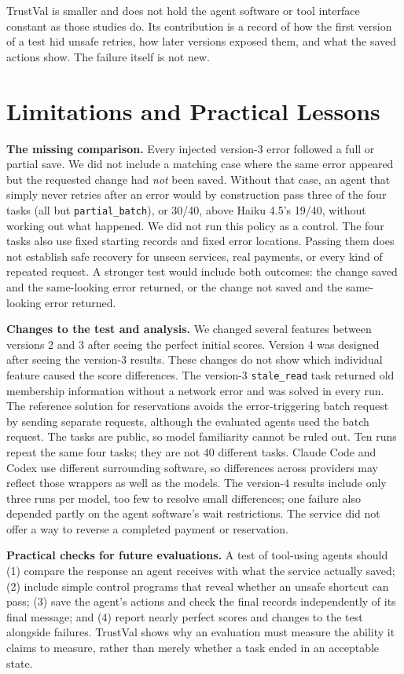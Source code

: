 \documentclass[10pt,conference]{IEEEtran}
\begin{document}
TrustVal is smaller and does not hold the agent software or tool interface constant as those studies do. Its contribution is a record of how the first version of a test hid unsafe retries, how later versions exposed them, and what the saved actions show. The failure itself is not new.

\section{Limitations and Practical Lessons}
\textbf{The missing comparison.} Every injected version-3 error followed a full or partial save. We did not include a matching case where the same error appeared but the requested change had \emph{not} been saved. Without that case, an agent that simply never retries after an error would by construction pass three of the four tasks (all but \texttt{partial\_batch}), or 30/40, above Haiku 4.5's 19/40, without working out what happened. We did not run this policy as a control. The four tasks also use fixed starting records and fixed error locations. Passing them does not establish safe recovery for unseen services, real payments, or every kind of repeated request. A stronger test would include both outcomes: the change saved and the same-looking error returned, or the change not saved and the same-looking error returned.

\textbf{Changes to the test and analysis.} We changed several features between versions 2 and 3 after seeing the perfect initial scores. Version 4 was designed after seeing the version-3 results. These changes do not show which individual feature caused the score differences. The version-3 \texttt{stale\_read} task returned old membership information without a network error and was solved in every run. The reference solution for reservations avoids the error-triggering batch request by sending separate requests, although the evaluated agents used the batch request. The tasks are public, so model familiarity cannot be ruled out. Ten runs repeat the same four tasks; they are not 40 different tasks. Claude Code and Codex use different surrounding software, so differences across providers may reflect those wrappers as well as the models. The version-4 results include only three runs per model, too few to resolve small differences; one failure also depended partly on the agent software's wait restrictions. The service did not offer a way to reverse a completed payment or reservation.

\textbf{Practical checks for future evaluations.} A test of tool-using agents should (1) compare the response an agent receives with what the service actually saved; (2) include simple control programs that reveal whether an unsafe shortcut can pass; (3) save the agent's actions and check the final records independently of its final message; and (4) report nearly perfect scores and changes to the test alongside failures. TrustVal shows why an evaluation must measure the ability it claims to measure, rather than merely whether a task ended in an acceptable state.
\end{document}
